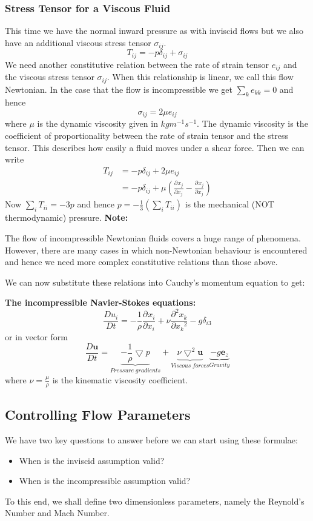 \documentclass[11pt]{article}
\newcommand*{\pd}[3][]{\ensuremath{\frac{\partial^{#1} {#3}}{\partial {#3}^{#1}}}}
\newcommand*{\md}[1]{\ensuremath{\frac{D #1}{D t}}}
\newcommand{\grad}{\bigtriangledown}
\newenvironment{note}
    {\textbf{Note:}\begin{mdframed}[backgroundcolor=white, roundcorner=5pt, linewidth=0pt]}
    {\end{mdframed}}
\newenvironment{formula}
	{\begin{mdframed}[backgroundcolor=white, roundcorner=5pt, linewidth=1pt, linecolor=red]}
	{\end{mdframed}}
\newcommand{\mv}[1]{\textbf{#1}}
\newcommand{\mdf}[1]{{\color{red}#1}}
\begin{document}
\subsubsection{Stress Tensor for a Viscous Fluid}
This time we have the normal inward pressure as with inviscid flows but we also have an additional \mdf{viscous stress tensor} $\sigma_{ij}$.
$$T_{ij}=-p\delta_{ij}+\sigma_{ij}$$
We need another constitutive relation between the rate of strain tensor $e_{ij}$ and the viscous stress tensor $\sigma_{ij}$.
When this relationship is linear, we call this flow \mdf{Newtonian}.
In the case that the flow is incompressible we get $\sum_k e_{kk}=0$ and hence
$$\sigma_{ij}=2\mu e_{ij}$$
where $\mu$ is the dynamic viscosity given in $kgm^{-1}s^{-1}$. The dynamic viscosity is the coefficient of proportionality between the rate of strain tensor and the stress tensor. This describes how easily a fluid moves under a shear force.
Then we can write
\begin{align*}
	T_{ij}&= -p\delta_{ij}+2\mu e_{ij}\\
		  &= -p\delta_{ij}+\mu\left(\pd{u_i}{x_j}-\pd{u_i}{x_j}\right)
\end{align*}
Now $\sum_i T_{ii} = -3p$ and hence $p=-\frac{1}{3}(\sum_i T_{ii})$ is the mechanical (NOT thermodynamic) pressure.
\begin{note}
The flow of incompressible Newtonian fluids covers a huge range of phenomena.
However, there are many cases in which non-Newtonian behaviour is encountered and hence we need more complex constitutive relations than those above.
\end{note}
We can now substitute these relations into Cauchy's momentum equation to get:
\begin{formula}
\textbf{The incompressible Navier-Stokes equations:}
$$\md{u_i}=-\frac{1}{\rho}\pd{p}{x_i}+\nu\pd[2]{u_i}{x_k}-g\delta_{i3}$$
or in vector form
$$\md{\mv{u}}=\underbrace{-\frac{1}{\rho}\grad{p}}_{Pressure\;gradients}+\underbrace{\nu\grad^2\mv{u}}_{Viscous\;forces}\underbrace{-g\mv{e}_z}_{Gravity}$$
where $\nu=\frac{\mu}{\rho}$ is the \mdf{kinematic viscosity coefficient}.
\end{formula}
\subsection{Controlling Flow Parameters}
We have two key questions to answer before we can start using these formulae:
\begin{itemize}
	\item When is the inviscid assumption valid?
	\item When is the incompressible assumption valid?
\end{itemize}
To this end, we shall define two \mdf{dimensionless parameters}, namely the Reynold's Number and Mach Number.
\end{document}
